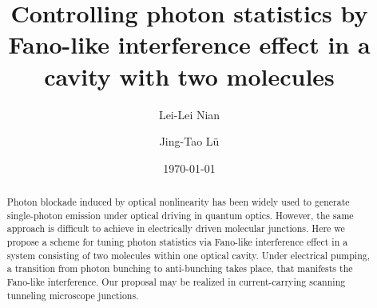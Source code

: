 \documentclass[aps,prb,
,floatfix,footinbib,longbibliography,
preprint
]{revtex4-1}
\newcommand{\revision}[1]{{\color{blue}{#1}}}
\begin{document}
\title{Controlling photon statistics by Fano-like interference effect in a cavity with two molecules}

\author{Lei-Lei Nian}
\author{Jing-Tao L\"{u}}




\date{\today}%
\begin{abstract}
Photon blockade induced by optical nonlinearity has been widely used to generate single-photon emission under optical driving in quantum optics. However, the same approach is difficult to achieve in electrically driven molecular junctions. Here we propose a scheme for tuning photon statistics via Fano-like interference effect in a system consisting of two molecules within one optical cavity.
Under electrical pumping, a transition from photon bunching to anti-bunching takes place, that manifests the Fano-like interference. \revision{Even in presence of the strong dipole-dipole interaction between molecules, a strong photon anti-bunching can be achieved based on the parameters extracted from experiments.}
Our proposal may be realized in current-carrying scanning tunneling microscope junctions.


\end{abstract}

\maketitle

\end{document}
